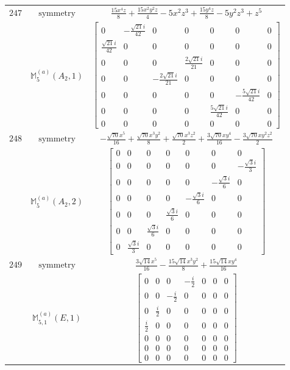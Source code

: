 \documentclass[fleqn,8pt,landscape]{jsarticle}
\begin{document}
\begin{longtable}{ccc}
$ 247 $ & $ \text{symmetry} $ & $ \frac{15 x^{4} z}{8} + \frac{15 x^{2} y^{2} z}{4} - 5 x^{2} z^{3} + \frac{15 y^{4} z}{8} - 5 y^{2} z^{3} + z^{5} $ \\
$  $ & $ \mathbb{M}_{5}^{(a)}(A_{2},1) $ & $ \begin{bmatrix} 0 & - \frac{\sqrt{21} i}{42} & 0 & 0 & 0 & 0 & 0 \\ \frac{\sqrt{21} i}{42} & 0 & 0 & 0 & 0 & 0 & 0 \\ 0 & 0 & 0 & \frac{2 \sqrt{21} i}{21} & 0 & 0 & 0 \\ 0 & 0 & - \frac{2 \sqrt{21} i}{21} & 0 & 0 & 0 & 0 \\ 0 & 0 & 0 & 0 & 0 & - \frac{5 \sqrt{21} i}{42} & 0 \\ 0 & 0 & 0 & 0 & \frac{5 \sqrt{21} i}{42} & 0 & 0 \\ 0 & 0 & 0 & 0 & 0 & 0 & 0 \end{bmatrix} $ \\ \hline
$ 248 $ & $ \text{symmetry} $ & $ - \frac{\sqrt{70} x^{5}}{16} + \frac{\sqrt{70} x^{3} y^{2}}{8} + \frac{\sqrt{70} x^{3} z^{2}}{2} + \frac{3 \sqrt{70} x y^{4}}{16} - \frac{3 \sqrt{70} x y^{2} z^{2}}{2} $ \\
$  $ & $ \mathbb{M}_{5}^{(a)}(A_{2},2) $ & $ \begin{bmatrix} 0 & 0 & 0 & 0 & 0 & 0 & 0 \\ 0 & 0 & 0 & 0 & 0 & 0 & - \frac{\sqrt{3} i}{3} \\ 0 & 0 & 0 & 0 & 0 & - \frac{\sqrt{3} i}{6} & 0 \\ 0 & 0 & 0 & 0 & - \frac{\sqrt{3} i}{6} & 0 & 0 \\ 0 & 0 & 0 & \frac{\sqrt{3} i}{6} & 0 & 0 & 0 \\ 0 & 0 & \frac{\sqrt{3} i}{6} & 0 & 0 & 0 & 0 \\ 0 & \frac{\sqrt{3} i}{3} & 0 & 0 & 0 & 0 & 0 \end{bmatrix} $ \\ \hline
$ 249 $ & $ \text{symmetry} $ & $ \frac{3 \sqrt{14} x^{5}}{16} - \frac{15 \sqrt{14} x^{3} y^{2}}{8} + \frac{15 \sqrt{14} x y^{4}}{16} $ \\
$  $ & $ \mathbb{M}_{5,1}^{(a)}(E,1) $ & $ \begin{bmatrix} 0 & 0 & 0 & - \frac{i}{2} & 0 & 0 & 0 \\ 0 & 0 & - \frac{i}{2} & 0 & 0 & 0 & 0 \\ 0 & \frac{i}{2} & 0 & 0 & 0 & 0 & 0 \\ \frac{i}{2} & 0 & 0 & 0 & 0 & 0 & 0 \\ 0 & 0 & 0 & 0 & 0 & 0 & 0 \\ 0 & 0 & 0 & 0 & 0 & 0 & 0 \\ 0 & 0 & 0 & 0 & 0 & 0 & 0 \end{bmatrix} $ \\ \hline

\end{longtable}
\end{document}
